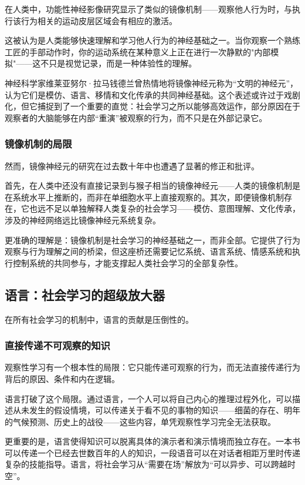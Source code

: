 \documentclass[11pt]{article}
\begin{document}
在人类中，功能性神经影像研究显示了类似的镜像机制——观察他人行为时，与执行该行为相关的运动皮层区域会有相应的激活。

这被认为是人类能够快速理解和学习他人行为的神经基础之一。当你观察一个熟练工匠的手部动作时，你的运动系统在某种意义上正在进行一次静默的"内部模拟"——这不只是视觉记录，而是一种体验性的理解。

神经科学家维莱亚努尔·拉马钱德兰曾热情地将镜像神经元称为“文明的神经元”，认为它们是模仿、语言、移情和文化传承的共同神经基础。这个表述或许过于戏剧化，但它捕捉到了一个重要的直觉：社会学习之所以能够高效运作，部分原因在于观察者的大脑能够在内部“重演”被观察的行为，而不只是在外部记录它。
\subsubsection{镜像机制的局限}
\label{sec:orga7fdfec}

然而，镜像神经元的研究在过去数十年中也遭遇了显著的修正和批评。

首先，在人类中还没有直接记录到与猴子相当的镜像神经元——人类的镜像机制是在系统水平上推断的，而非在单细胞水平上直接观察的。其次，即便镜像机制存在，它也远不足以单独解释人类复杂的社会学习——模仿、意图理解、文化传承，涉及的神经网络远比镜像神经元系统复杂。

更准确的理解是：镜像机制是社会学习的神经基础之一，而非全部。它提供了行为观察与行为理解之间的桥梁，但这座桥还需要记忆系统、语言系统、情感系统和执行控制系统的共同参与，才能支撑起人类社会学习的全部复杂性。
\subsection{语言：社会学习的超级放大器}
\label{sec:org93b3eeb}

在所有社会学习的机制中，语言的贡献是压倒性的。
\subsubsection{直接传递不可观察的知识}
\label{sec:org58dade3}

观察性学习有一个根本性的局限：它只能传递可观察的行为，而无法直接传递行为背后的原因、条件和内在逻辑。

语言打破了这个局限。通过语言，一个人可以将自己内心的推理过程外化，可以描述从未发生的假设情境，可以传递关于看不见的事物的知识——细菌的存在、明年的气候预测、历史上的战役——这些内容，单凭观察性学习完全无法获取。

更重要的是，语言使得知识可以脱离具体的演示者和演示情境而独立存在。一本书可以传递一个已经去世数百年的人的知识，一段语音可以在对话者相距万里时传递复杂的技能指导。语言，将社会学习从“需要在场”解放为“可以异步、可以跨越时空”。
\end{document}
